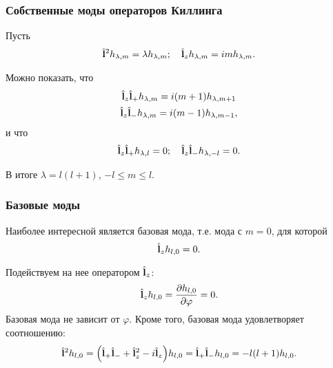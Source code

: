 \documentclass{beamer}
\begin{document}
    \begin{frame}\frametitle{Собственные моды операторов Киллинга}

        Пусть
        \begin{equation}\begin{gathered}
            \hat{\mathbf{l}}^2 h_{\lambda,m} = \lambda h_{\lambda,m} ; \quad
            \hat{\mathbf{l}}_z h_{\lambda,m} = i m h_{\lambda,m} .
        \end{gathered}\end{equation}

        Можно показать, что
        \begin{equation}\begin{gathered}
            \hat{\mathbf{l}}_z \hat{\mathbf{l}}_{+} h_{\lambda,m} = i (m + 1) h_{\lambda,m+1} \\
            \hat{\mathbf{l}}_z \hat{\mathbf{l}}_{-} h_{\lambda,m} = i (m - 1) h_{\lambda,m-1} ,
        \end{gathered}\end{equation}
        и что
        \begin{equation}\begin{gathered}
            \hat{\mathbf{l}}_z \hat{\mathbf{l}}_{+} h_{\lambda,l} = 0 ; \quad
            \hat{\mathbf{l}}_z \hat{\mathbf{l}}_{-} h_{\lambda,-l} = 0 .
        \end{gathered}\end{equation}

        В итоге $\lambda = l (l + 1)$, $- l \le m \le l$.

    \end{frame}


    \begin{frame}\frametitle{Базовые моды}

        Наиболее интересной является базовая мода, т.е. мода с $m = 0$, для которой
        \begin{equation}
            \hat{\mathbf{l}}_z h_{l, 0} = 0 .
        \end{equation}

        Подействуем на нее оператором $\hat{\mathbf{l}}_z$:
        \begin{equation}
            \hat{\mathbf{l}}_z h_{l, 0} = \pdv{h_{l, 0}}{\varphi} = 0 .
        \end{equation}
        Базовая мода не зависит от $\varphi$. Кроме того, базовая мода удовлетворяет соотношению:
        \begin{equation}
            \hat{\mathbf{l}}^2 h_{l, 0}
                = \qty( \hat{\mathbf{l}}_{+} \hat{\mathbf{l}}_{-} + \hat{\mathbf{l}}_z^2 - i \hat{\mathbf{l}}_z ) h_{l, 0}
                = \hat{\mathbf{l}}_{+} \hat{\mathbf{l}}_{-} h_{l, 0}
                = - l (l + 1) h_{l, 0} .
        \end{equation}

    \end{frame}
\end{document}
